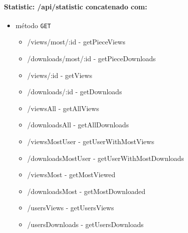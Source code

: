\paragraph{Statistic: /api/statistic concatenado com:}
        \begin{itemize}
            \item método \texttt{GET}
                \begin{itemize}
                    \item /views/most/:id - getPieceViews
                    \item /downloads/most/:id - getPieceDownloads
                    \item /views/:id - getViews
                    \item /downloads/:id - getDownloads
                    \item /viewsAll - getAllViews
                    \item /downloadsAll - getAllDownloads
                    \item /viewsMostUser - getUserWithMostViews
                    \item /downloadsMostUser - getUserWithMostDownloads
                    \item /viewsMost - getMostViewed
                    \item /downloadsMost - getMostDownloaded
                    \item /usersViews - getUsersViews
                    \item /usersDownloads - getUsersDownloads
                \end{itemize}
        \end{itemize}


